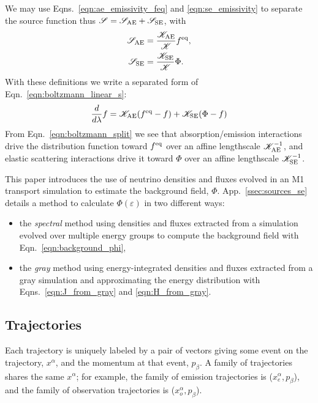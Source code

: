 \documentclass[aps,floatfix,prd,superscriptaddress,twocolumn]{revtex4-1}
\begin{document}
We may use Eqns.~\ref{eqn:ae_emissivity_feq} and \ref{eqn:se_emissivity}
to separate the source function thus
$\mathscr{S}=\mathscr{S}_{\rm AE}+\mathscr{S}_{\rm SE}$, with
\begin{align}
  \label{eqn:source_ae}
  \mathscr{S}_{\rm AE}
  &= \frac{\mathscr{K}_{\rm AE}}{\mathscr{K}} f^{\rm eq}, \\
  \label{eqn:source_se}
  \mathscr{S}_{\rm SE}
  &= \frac{\mathscr{K}_{\rm SE}}{\mathscr{K}} \Phi.
\end{align}
With these definitions we write a separated form of
Eqn.~\ref{eqn:boltzmann_linear_s}:
\begin{equation}
  \label{eqn:boltzmann_split}
  \frac{d}{d\lambda}f =
  \mathscr{K}_{\rm AE}(f^{\rm eq}-f)
  + \mathscr{K}_{\rm SE}(\Phi-f)
\end{equation}
From Eqn.~\ref{eqn:boltzmann_split} we see that
absorption/emission interactions drive the distribution function
toward $f^{\rm eq}$ over an affine lengthscale $\mathscr{K}_{\rm AE}^{-1}$,
and elastic scattering interactions drive it
toward $\Phi$ over an affine lengthscale $\mathscr{K}_{\rm SE}^{-1}$.

This paper introduces the use of neutrino densities and fluxes evolved in an
M1 transport simulation to estimate the background field, $\Phi$.
App.~\ref{ssec:sources_se} details a method to calculate
$\Phi(\varepsilon)$ in two different ways:
\begin{itemize}
\item
  the \emph{spectral} method using densities and fluxes
  extracted from a simulation evolved over multiple energy groups
  to compute the background field with Eqn.~\ref{eqn:background_phi},
\item
  the \emph{gray} method using energy-integrated densities and fluxes
  extracted from a gray simulation and approximating the
  energy distribution with Eqns.~\ref{eqn:J_from_gray} and
  \ref{eqn:H_from_gray}.
\end{itemize}

\subsection{Trajectories}
\label{ssec:trajectories}
Each trajectory is uniquely labeled by a pair of vectors
giving some event on the trajectory, $x^\alpha$,
and the momentum at that event, $p_\beta$.
A family of trajectories shares the same $x^\alpha$; for example,
the family of emission trajectories is ($x^\alpha_e,p_\beta$),
and the family of observation trajectories is ($x^\alpha_o,p_\beta$).
\end{document}
